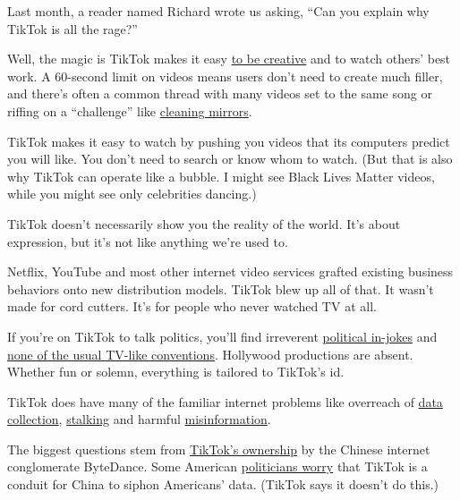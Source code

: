 Last month, a reader named Richard wrote us asking, ``Can you explain
why TikTok is all the rage?''

Well, the magic is TikTok makes it easy
\href{https://www.nytimes3xbfgragh.onion/interactive/2019/10/10/arts/TIK-TOK.html}{to
be creative} and to watch others' best work. A 60-second limit on videos
means users don't need to create much filler, and there's often a common
thread with many videos set to the same song or riffing on a
``challenge'' like
\href{https://www.vulture.com/2020/06/tiktok-wipe-it-down-challenge-bmw-kenny-explainer.html}{cleaning
mirrors}.

TikTok makes it easy to watch by pushing you videos that its computers
predict you will like. You don't need to search or know whom to watch.
(But that is also why TikTok can operate like a bubble. I might see
Black Lives Matter videos, while you might see only celebrities
dancing.)

TikTok doesn't necessarily show you the reality of the world. It's about
expression, but it's not like anything we're used to.

Netflix, YouTube and most other internet video services grafted existing
business behaviors onto new distribution models. TikTok blew up all of
that. It wasn't made for cord cutters. It's for people who never watched
TV at all.

If you're on TikTok to talk politics, you'll find irreverent
\href{https://melmagazine.com/en-us/story/camp-pence-tiktok-memes-lgbtq-conversion-therapy}{political
in-jokes} and
\href{https://www.nytimes3xbfgragh.onion/2020/02/27/style/tiktok-politics-bernie-trump.html}{none
of the usual TV-like conventions}. Hollywood productions are absent.
Whether fun or solemn, everything is tailored to TikTok's id.

TikTok does have many of the familiar internet problems like overreach
of
\href{https://www.nytimes3xbfgragh.onion/2020/05/14/technology/tiktok-kids-privacy.html}{data
collection},
\href{https://www.latimes.com/local/lanow/la-me-ln-tik-tok-lewd-acts-arrest-20190214-story.html}{stalking}
and harmful
\href{https://www.mediamatters.org/fake-news/tiktok-hosting-videos-spreading-misinformation-about-coronavirus-despite-platforms-new}{misinformation}.

The biggest questions stem from
\href{https://www.nytimes3xbfgragh.onion/2019/11/18/technology/tiktok-alex-zhu-interview.html}{TikTok's
ownership} by the Chinese internet conglomerate ByteDance. Some American
\href{https://www.politico.com/newsletters/morning-tech/2020/05/28/house-democrats-join-gop-in-going-after-tiktok-787945}{politicians
worry} that TikTok is a conduit for China to siphon Americans' data.
(TikTok says it doesn't do this.)

